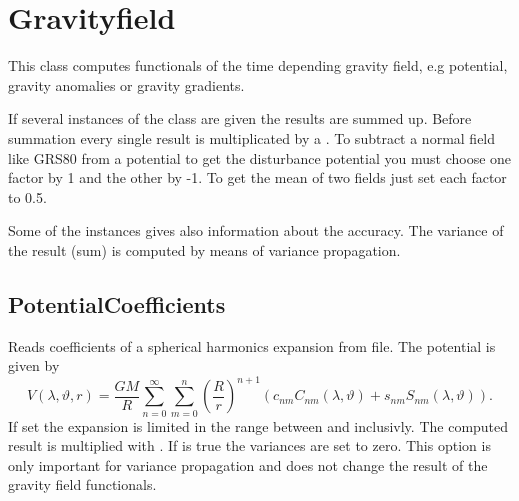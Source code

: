\clearpage

\section{Gravityfield}\label{gravityfieldType}
This class computes functionals of the time depending gravity field,
e.g potential, gravity anomalies or gravity gradients.

If several instances of the class are given the results are summed up.
Before summation every single result is multiplicated by a .
To subtract a normal field like GRS80 from a potential
to get the disturbance potential you must choose one factor by 1
and the other by -1. To get the mean of two fields just set each factor to 0.5.

Some of the instances gives also information about the accuracy.
The variance of the result (sum) is computed by means of variance propagation.


\subsection{PotentialCoefficients}\label{gravityfieldType:potentialCoefficients}
Reads coefficients of a spherical harmonics expansion from file.
The potential is given by
\begin{equation}
V(\lambda,\vartheta,r) = \frac{GM}{R}\sum_{n=0}^\infty \sum_{m=0}^n \left(\frac{R}{r}\right)^{n+1}
  \left(c_{nm} C_{nm}(\lambda,\vartheta) + s_{nm} S_{nm}(\lambda,\vartheta)\right).
\end{equation}
If set the expansion is limited in the range between 
and  inclusivly. The computed result
is multiplied with . If  is true
the variances are set to zero. This option is only important for variance propagation
and does not change the result of the gravity field functionals.


